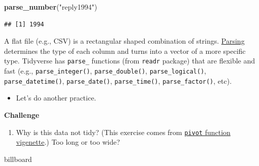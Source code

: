 \documentclass[
]{book}
\newenvironment{Shaded}{\begin{snugshade}}{\end{snugshade}}
\newcommand{\FunctionTok}[1]{\textcolor[rgb]{0.13,0.29,0.53}{\textbf{#1}}}
\newcommand{\NormalTok}[1]{#1}
\newcommand{\StringTok}[1]{\textcolor[rgb]{0.31,0.60,0.02}{#1}}
\providecommand{\tightlist}{%
  \setlength{\itemsep}{0pt}\setlength{\parskip}{0pt}}
\begin{document}
\begin{Shaded}
\begin{Highlighting}[]
\FunctionTok{parse\_number}\NormalTok{(}\StringTok{"reply1994"}\NormalTok{)}
\end{Highlighting}
\end{Shaded}

\begin{verbatim}
## [1] 1994
\end{verbatim}

A flat file (e.g., CSV) is a rectangular shaped combination of strings. \href{https://cran.r-project.org/web/packages/readr/vignettes/readr.html}{Parsing} determines the type of each column and turns into a vector of a more specific type. Tidyverse has \texttt{parse\_} functions (from \texttt{readr} package) that are flexible and fast (e.g., \texttt{parse\_integer()}, \texttt{parse\_double()}, \texttt{parse\_logical()}, \texttt{parse\_datetime()}, \texttt{parse\_date()}, \texttt{parse\_time()}, \texttt{parse\_factor()}, etc).

\begin{itemize}
\tightlist
\item
  Let's do another practice.
\end{itemize}

\textbf{Challenge}

\begin{enumerate}
\def\labelenumi{\arabic{enumi}.}
\tightlist
\item
  Why is this data not tidy? (This exercise comes from \href{https://tidyr.tidyverse.org/articles/pivot.html}{\texttt{pivot} function vigenette}.) Too long or too wide?
\end{enumerate}

\begin{Shaded}
\begin{Highlighting}[]
\NormalTok{billboard}
\end{Highlighting}
\end{Shaded}
\end{document}
